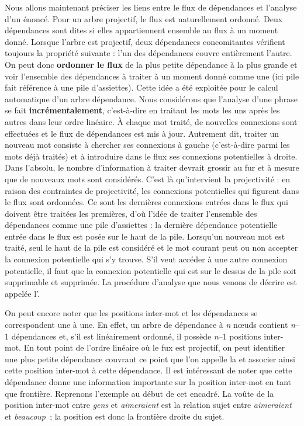 {    Nous allons maintenant préciser les liens entre le flux de dépendances et l’analyse d’un énoncé. Pour un arbre projectif, le flux est naturellement ordonné. Deux dépendances sont dites  si elles appartiennent ensemble au flux à un moment donné. Lorsque l’arbre est projectif, deux dépendances concomitantes vérifient toujours la propriété suivante : l’un des dépendances couvre entièrement l’autre. On peut donc \textbf{ordonner le flux} de la plus petite dépendance à la plus grande et voir l’ensemble des dépendances à traiter à un moment donné comme une  (ici pile fait référence à une pile d’assiettes). Cette idée a été exploitée pour le calcul automatique d’un arbre dépendance. Nous considérons que l’analyse d’une phrase se fait \textbf{incrémentalement}, c’est-à-dire en traitant les mots les uns après les autres dans leur ordre linéaire. À chaque mot traité, de nouvelles connexions sont effectuées et le flux de dépendances est mis à jour. Autrement dit, traiter un nouveau mot consiste à chercher ses connexions à gauche (c’est-à-dire parmi les mots déjà traités) et à introduire dans le flux ses connexions potentielles à droite. Dans l’absolu, le nombre d’information à traiter devrait grossir au fur et à mesure que de nouveaux mots sont considérés. C’est là qu’intervient la projectivité : en raison des contraintes de projectivité, les connexions potentielles qui figurent dans le flux sont ordonnées. Ce sont les dernières connexions entrées dans le flux qui doivent être traitées les premières, d’où l’idée de traiter l’ensemble des dépendances comme une pile d’assiettes : la dernière dépendance potentielle entrée dans le flux est posée sur le haut de la pile. Lorsqu’un nouveau mot est traité, seul le haut de la pile est considéré et le mot courant peut ou non accepter la connexion potentielle qui s’y trouve. S’il veut accéder à une autre connexion potentielle, il faut que la connexion potentielle qui est sur le dessus de la pile soit supprimable et supprimée. La procédure d’analyse que nous venons de décrire est appelée l’.

    On peut encore noter que les positions inter-mot et les dépendances se correspondent une à une. En effet, un arbre de dépendance à \textit{n} nœuds contient \textit{n}–1 dépendances et, s’il est linéairement ordonné, il possède \textit{n}–1 positions inter-mot. En tout point de l’ordre linéaire où le fux est projectif, on peut identifier une plus petite dépendance couvrant ce point que l’on appelle la  et associer ainsi cette position inter-mot à cette dépendance. Il est intéressant de noter que cette dépendance donne une information importante sur la position inter-mot en tant que frontière. Reprenons l’exemple au début de cet encadré. La voûte de la position inter-mot entre \textit{gens} et \textit{aimeraient} est la relation sujet entre \textit{aimeraient} et \textit{beaucoup~}; la position est donc la frontière droite du sujet.
}
